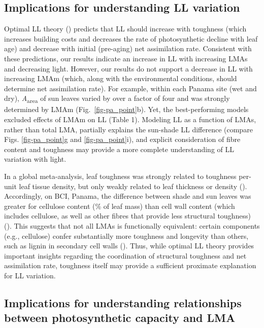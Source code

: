 \documentclass[
  12pt,
  letterpaper,
  DIV=11,
  numbers=noendperiod]{scrartcl}
\begin{document}
\subsection{Implications for understanding LL
variation}\label{implications-for-understanding-ll-variation}

Optimal LL theory () predicts
that LL should increase with toughness (which increases building costs
and decreases the rate of photosynthetic decline with leaf age) and
decrease with initial (pre-aging) net assimilation rate. Consistent with
these predictions, our results indicate an increase in LL with
increasing LMAs and decreasing light. However, our results do not
support a decrease in LL with increasing LMAm (which, along with the
environmental conditions, should determine net assimilation rate). For
example, within each Panama site (wet and dry),
\emph{A}\textsubscript{area} of sun leaves varied by over a factor of
four and was strongly determined by LMAm (Fig.~\ref{fig-pa_point}b).
Yet, the best-performing models excluded effects of LMAm on LL (Table
1). Modeling LL as a function of LMAs, rather than total LMA, partially
explains the sun-shade LL difference (compare Figs. \ref{fig-pa_point}g
and \ref{fig-pa_point}i), and explicit consideration of fibre content
and toughness may provide a more complete understanding of LL variation
with light.

In a global meta-analysis, leaf toughness was strongly related to
toughness per-unit leaf tissue density, but only weakly related to leaf
thickness or density ().
Accordingly, on BCI, Panama, the difference between shade and sun leaves
was greater for cellulose content (\% of leaf mass) than cell wall
content (which includes cellulose, as well as other fibres that provide
less structural toughness) (). This suggests that not all LMAs is functionally equivalent:
certain components (e.g., cellulose) confer substantially more toughness
and longevity than others, such as lignin in secondary cell walls
(). Thus, while optimal
LL theory provides important insights regarding the coordination of
structural toughness and net assimilation rate, toughness itself may
provide a sufficient proximate explanation for LL variation.

\subsection{Implications for understanding relationships between
photosynthetic capacity and
LMA}\label{implications-for-understanding-relationships-between-photosynthetic-capacity-and-lma}
\end{document}
